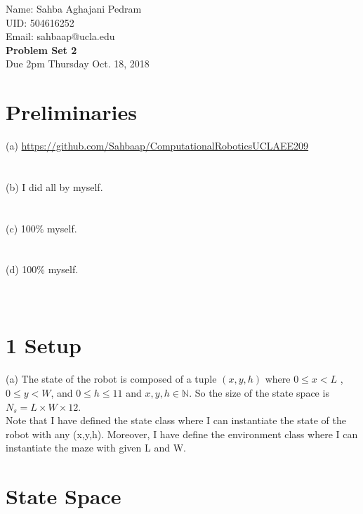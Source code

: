 \documentclass{article}
\begin{document}
	
	
	\begin{center}
	
	\LARGE Name: Sahba Aghajani Pedram \\
	\LARGE UID: 504616252 \\
	\LARGE Email: sahbaap@ucla.edu \\
	
	\vspace{30pt}
	\textbf{Problem Set 2} \\
 	Due 2pm Thursday Oct. 18, 2018 
 	
	 \end{center}

	\vspace{30pt}

	\section*{Preliminaries}
	(a) \url{https://github.com/Sahbaap/ComputationalRoboticsUCLAEE209}          \\ \\ \\
	(b) I did all by myself. \\ \\ \\
	(c) 100\% myself. \\ \\ \\
	(d) 100\% myself. \\ \\ \\
	
	
	
	\newpage
	\section*{1  Setup}
	(a) The state of the robot is composed of a tuple $(x,y,h)$ where $0 \le x < L$ , $0 \le y < W$, and $0 \le h \le 11$ and $x,y,h \in \mathbb{N}$. So the size of the state space is $N_{s} = L \times W \times 12$. \\
	Note that I have defined the state class where I can instantiate the state of the robot with any (x,y,h). Moreover, I have define the environment class where I can instantiate the maze with given L and W. 
	
	\section*{State Space}
	 \vspace{30pt}
\end{document}
